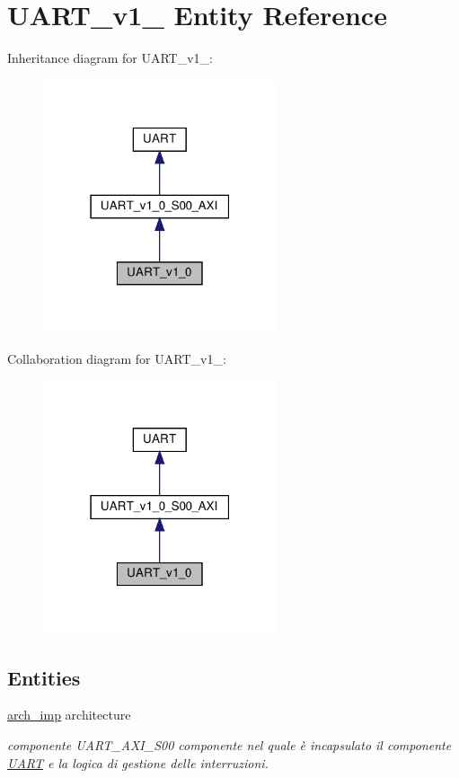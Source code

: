 \hypertarget{classUART__v1__0}{}\section{U\+A\+R\+T\+\_\+v1\+\_ Entity Reference}
\label{classUART__v1__0}


Inheritance diagram for U\+A\+R\+T\+\_\+v1\+\_\+:\nopagebreak
\begin{figure}[H]
\begin{center}
\leavevmode
\includegraphics[width=195pt]{classUART__v1__0__inherit__graph}
\end{center}
\end{figure}


Collaboration diagram for U\+A\+R\+T\+\_\+v1\+\_\+:\nopagebreak
\begin{figure}[H]
\begin{center}
\leavevmode
\includegraphics[width=195pt]{classUART__v1__0__coll__graph}
\end{center}
\end{figure}
\subsection*{Entities}
\begin{DoxyCompactItemize}
\item 
\hyperlink{classUART__v1__0_1_1arch__imp}{arch\+\_\+imp} architecture
\begin{DoxyCompactList}\small\item\em componente U\+A\+R\+T\+\_\+\+A\+X\+I\+\_\+\+S00  componente nel quale è incapsulato il componente \hyperlink{structUART}{U\+A\+RT} e la logica di gestione delle interruzioni. \end{DoxyCompactList}\end{DoxyCompactItemize}
